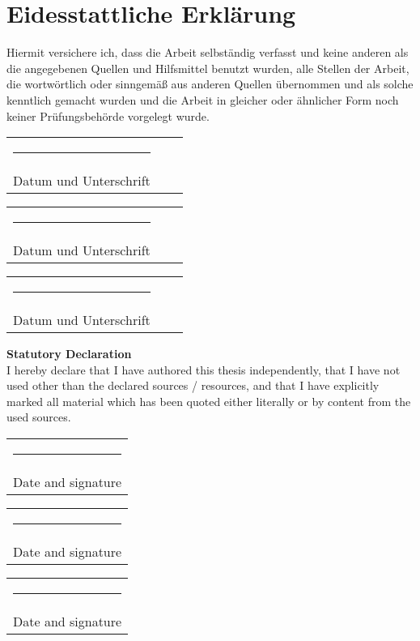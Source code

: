 \section{Eidesstattliche Erklärung}
Hiermit versichere ich, dass die Arbeit selbständig verfasst und keine anderen als die angegebenen Quellen und Hilfsmittel benutzt wurden, alle Stellen der Arbeit, die wortwörtlich oder sinngemäß aus anderen Quellen übernommen und als solche kenntlich gemacht wurden und die Arbeit in gleicher oder ähnlicher Form noch keiner Prüfungsbehörde vorgelegt wurde.\\[10pt]

\noindent
\begin{tabular}{lcl}
    \rule{5cm}{0.5pt}\\
    Datum und Unterschrift
\end{tabular}
\vspace{0.5cm}

\noindent
\begin{tabular}{lcl}
    \rule{5cm}{0.5pt}\\
    Datum und Unterschrift\\
\end{tabular}
\vspace{0.5cm}

\noindent
\begin{tabular}{lcl}
    \rule{5cm}{0.5pt}\\
    Datum und Unterschrift\\
\end{tabular}
\vspace{1cm}

\noindent
\Large
\textbf{Statutory Declaration}\\[10pt]
\normalsize
I hereby declare that I have authored this thesis independently, that I have not used other than the declared sources / resources, and that I have explicitly marked all material which has been quoted either literally or by content from the used sources.\\[10pt]

\noindent
\begin{tabular}{l}
    \rule{5cm}{0.5pt}\\
    Date and signature\\
\end{tabular}
\vspace{0.5cm}

\noindent
\begin{tabular}{l}
    \rule{5cm}{0.5pt}\\
    Date and signature\\
\end{tabular}
\vspace{0.5cm}

\noindent
\begin{tabular}{l}
    \rule{5cm}{0.5pt}\\
    Date and signature\\
\end{tabular}